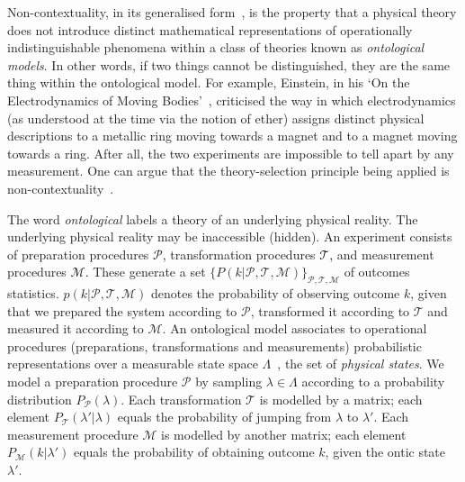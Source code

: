 \documentclass[%
 reprint,
superscriptaddress,
nofootinbib,
bibnotes,
 amsmath,amssymb,
 aps,
]{revtex4-1}
\theoremstyle{plain}
\newcommand{\Dave}[1]{\textcolor{black}{#1} }
\begin{document}
Non-contextuality, in its generalised form~\cite{spekkens2005contextuality,Quanta22}, is the property that a physical theory does not introduce distinct 
mathematical representations of operationally indistinguishable phenomena within a class of theories known as \emph{ontological models}. In other words, if two things cannot be 
distinguished, 
they are the same thing within the ontological model.
For example, Einstein, in his `On the Electrodynamics of Moving Bodies'~\cite{einstein1905electrodynamics}, criticised the way in which electrodynamics (as understood at the time via the notion of ether) assigns distinct physical descriptions to a metallic ring moving towards a magnet and to a magnet moving towards a ring. After all, the two experiments are impossible to tell apart by any measurement. One can argue that the theory-selection principle 
being applied is non-contextuality~\cite{spekkens2019ontological}.
 

The word \emph{ontological} labels a theory of an underlying physical reality. The underlying physical reality may be inaccessible (hidden).  An experiment consists of preparation procedures \Dave{$\mathscr{P}$,} transformation procedures \Dave{$\mathscr{T}$,} and measurement procedures \Dave{$\mathscr{M}$.} These generate a set $\{P(k|\mathscr{P},{\mathscr{T}},{\mathscr{M}}) \}_{\mathscr{P},{\mathscr{T}},{\mathscr{M}}}$ of outcomes statistics. $p(k|\mathscr{P},{\mathscr{T}},{\mathscr{M}})$ denotes the probability of observing outcome $k$, given that we prepared the system according to $\mathscr{P}$, transformed it according to ${\mathscr{T}}$ and measured it according to ${\mathscr{M}}$.
An ontological model associates to operational procedures (preparations, transformations and measurements) probabilistic representations over a measurable state space $\Lambda$~\cite{Quanta22},  the set of \emph{physical states}.
We model a preparation procedure $\mathscr{P}$ by sampling
$\lambda \in \Lambda$ according to a probability distribution $P_{\mathscr{P}}(\lambda)$. Each  transformation ${\mathscr{T}}$ is modelled by a matrix; each element $P_{\mathscr{T}}(\lambda'|\lambda)$ equals the probability of jumping from $\lambda$ to $\lambda'$. Each measurement procedure ${\mathscr{M}}$ is modelled by another matrix; each element $P_{\mathscr{M}}(k|\lambda')$ equals the probability of obtaining outcome $k$, given the ontic state $\lambda'$.  
\end{document}
